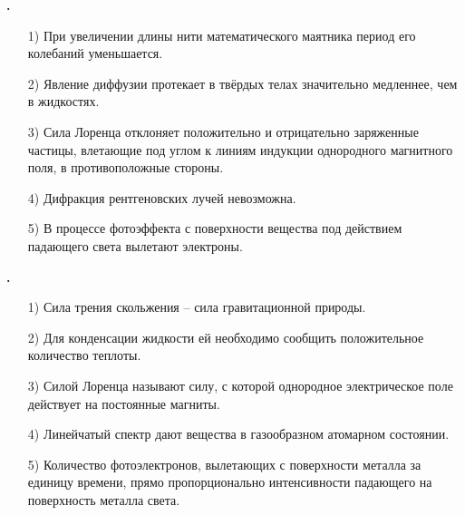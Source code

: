 \documentclass[12pt,a4paper]{article}
\newif\ifShowSolutions
\newcounter{banktask}
\newcommand{\BankTask}[3]{%
  \refstepcounter{banktask}%
  \Needspace{35mm}\par\medskip\noindent\begin{minipage}{\linewidth}%
  \noindent\textbf{\thebanktask.}\quad #2\par
  \ifShowSolutions
    #3\par
    \ifdefined\TutorEdition
      \ifcsname TutorSource#1\endcsname
        \smallskip{\small\csname TutorSource#1\endcsname\par}%
      \fi
    \fi
  \fi
  \end{minipage}\par\medskip
}
\begin{document}
\BankTask{027C91}{
\begin{enumerate}
\item[1)] При увеличении длины нити математического маятника период его колебаний уменьшается.
\item[2)] Явление диффузии протекает в твёрдых телах значительно медленнее, чем в жидкостях.
\item[3)] Сила Лоренца отклоняет положительно и отрицательно заряженные частицы, влетающие под углом к линиям индукции однородного магнитного поля, в противоположные стороны.
\item[4)] Дифракция рентгеновских лучей невозможна.
\item[5)] В процессе фотоэффекта с поверхности вещества под действием падающего света вылетают электроны.
\end{enumerate}
}{
\smallskip\noindent\textbf{Решение от GPT}\par
1) Неверно: \(T=2\pi\sqrt{\ell/g}\), поэтому с увеличением длины период растёт. 2) Верно: диффузия в твёрдых телах значительно медленнее вследствие меньшей подвижности частиц. 3) Верно: сила \(\vec F=q\,\vec v\times\vec B\) при смене знака заряда меняет направление на противоположное. 4) Неверно: рентгеновские лучи дифрагируют, например, на кристаллической решётке. 5) Верно: внешний фотоэффект представляет собой вылет электронов из вещества под действием света; ответ: \(2,\ 3,\ 5\).
}

\BankTask{5A149B}{
\begin{enumerate}
\item[1)] Сила трения скольжения – сила гравитационной природы.
\item[2)] Для конденсации жидкости ей необходимо сообщить положительное количество теплоты.
\item[3)] Силой Лоренца называют силу, с которой однородное электрическое поле действует на постоянные магниты.
\item[4)] Линейчатый спектр дают вещества в газообразном атомарном состоянии.
\item[5)] Количество фотоэлектронов, вылетающих с поверхности металла за единицу времени, прямо пропорционально интенсивности падающего на поверхность металла света.
\end{enumerate}
}{
\smallskip\noindent\textbf{Решение от GPT}\par
1) Неверно: сила трения имеет электромагнитную природу. 2) Неверно: при конденсации пар отдаёт теплоту, \(Q=-Lm\). 3) Неверно: магнитная сила Лоренца действует на движущийся заряд, \(\vec F=q\,\vec v\times\vec B\). 4) Верно: переходы между дискретными энергетическими уровнями атомов дают линейчатый спектр. 5) Верно: при неизменной частоте света выше красной границы число вылетающих фотоэлектронов за единицу времени прямо пропорционально интенсивности света; ответ: \(4,\ 5\).
}
\end{document}

